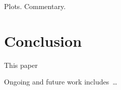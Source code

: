 \documentclass[runningheads]{llncs}
\begin{document}
Plots.
Commentary.

\section{Conclusion}
\label{Conclusion}

This paper 

Ongoing and future work includes~\ldots



\end{document}
